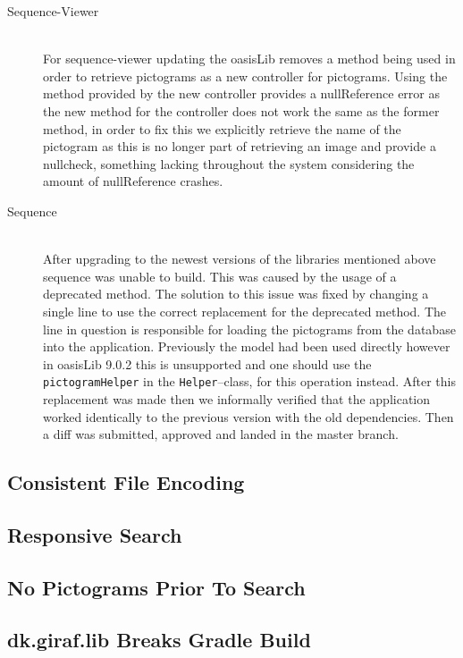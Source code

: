 \begin{description}
    \item[Sequence-Viewer] \hfill \\
    For sequence-viewer updating the oasisLib removes a method being used in order to retrieve pictograms as a new controller for pictograms.
    Using the method provided by the new controller provides a nullReference error as the new method for the controller does not work the same as the former method, in order to fix this we explicitly retrieve the name of the pictogram as this is no longer part of retrieving an image and provide a nullcheck, something lacking throughout the system considering the amount of nullReference crashes.
    \item[Sequence] \hfill \\
    After upgrading to the newest versions of the libraries mentioned above sequence was unable to build.
    This was caused by the usage of a deprecated method. 
    The solution to this issue was fixed by changing a single line to use the correct replacement for the deprecated method.
    The line in question is responsible for loading the pictograms from the database into the application. 
    Previously the model had been used directly however in oasisLib 9.0.2 this is unsupported and one should use the \texttt{pictogramHelper} in the \texttt{Helper}--class, for this operation instead.
    After this replacement was made then we informally verified that the application worked identically to the previous version with the old dependencies.
    Then a diff was submitted, approved and landed in the master branch. 
\end{description}
\subsection{Consistent File Encoding}
\subsection{Responsive Search}
\subsection{No Pictograms Prior To Search}
\subsection{dk.giraf.lib Breaks Gradle Build}
